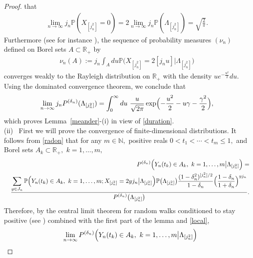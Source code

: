 \documentclass[12pt]{amsart}
\begin{document}
\begin{proof}
that
\begin{eqnarray}
\label{local}
 \lim_{n\to\infty} j_n {{\mathbb P}} (X_{[j_n^2]}=0) = 2\lim_{n\to\infty} j_n {{\mathbb P}} (\Lambda_{[j_n^2]}) =
\sqrt{{\frac {\displaystyle {2}}{\displaystyle {\pi} }}}. \end{eqnarray} Furthermore (see for instance
\cite{iglehart}), the sequence of probability measures $(\nu_n)$
defined on Borel sets $A\subset {{\mathbb R}}_+$ by \begin{eqnarray*} \nu_n(A):=j_n\int_A
du{{\mathbb P}}\bigl(X_{[j_n^2]}=2[j_n u] \bigl| \Lambda_{[j_n^2]}\bigr) \end{eqnarray*}
converges weakly to the Rayleigh distribution on ${{\mathbb R}}_+$ with the
density $ue^{-\frac{u^2}{2}}du.$ Using the dominated convergence
theorem, we conclude that \begin{eqnarray*}  \lim_{n\to\infty} j_n
P^{(\delta_n)}(\Lambda_{[j_n^2]})=\int_0^{\infty} du \
\frac{u}{\sqrt{2\pi }} \exp \Bigl(-{\frac {\displaystyle {u^2}}{\displaystyle {2} }} - u \gamma -
\frac{\gamma^2 }{2} \Bigr), \end{eqnarray*} which proves
Lemma~\ref{meander}-(i) in view of \eqref{duration}.
\\
$\mbox{}$
\\
(ii)~ First we will prove the convergence of finite-dimensional
distributions. It follows from \eqref{radon} that for any $m\in{{\mathbb N}},$ positive reals
$0<t_1<\cdots <t_m\leq 1,$  and Borel sets $A_k\subset {{\mathbb R}}_+,$ $k=1,\ldots, m,$ \begin{eqnarray} \label{tight}
&& \qquad \qquad \qquad \qquad
P^{(\delta_n)}\Bigl( Y_n(t_k)\in A_k,~k=1,\ldots,m\bigr| \Lambda_{[j_n^2]}\Bigr) = \\
\nonumber
&& {\frac {\displaystyle {\sum_{y\in J_n} {{\mathbb P}}\Bigl(Y_n(t_k)\in A_k,~k=1,\ldots,m;X_{[j_n^2]}=2yj_n\bigl|
\Lambda_{[j_n^2]}\Bigr) {{\mathbb P}}\bigl( \Lambda_{[j_n^2]}\bigr)
{\frac {\displaystyle {(1-\delta_n^2)^{[j_n^2]/2}}}{\displaystyle {1-\delta_n} }}\Bigr(\frac{1-\delta_n}{1+\delta_n}\Bigr)^{yj_n}}}{\displaystyle {P^{(\delta_n)}\bigl(\Lambda_{[j_n^2]}\bigr)} }}.
\end{eqnarray}
Therefore, by the central limit theorem for
random walks conditioned to stay positive (see \cite{bolthausen, iglehart})
combined with the first part of the lemma and \eqref{local},
\begin{eqnarray*}
&&
\lim_{n\to\infty} P^{(\delta_n)}
\Bigl(Y_n(t_k)\in A_k,~k=1,\ldots,m\bigr| \Lambda_{[j_n^2]}\Bigr)
\\

\end{eqnarray*}
\end{proof}
\end{document}
